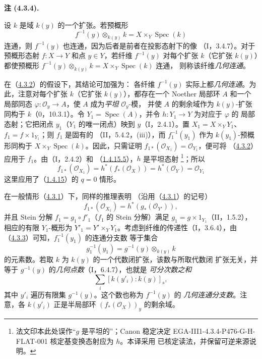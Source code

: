 \documentclass[UTF8,fontset=none,11pt,oneside,openany]{ctexbook}
\newcommand{\SourceCorrectionNote}[1]{\footnote{#1}}
\newenvironment{remark}[1][]{%
  \par\medskip\noindent\textbf{注 (#1).}\ %
}{\par}
\newcommand{\oldpage}[2][]{%
  \hypertarget{ega-source-page-#1-#2}{}%
  \marginnote{\scriptsize\textbf{#1}~|~#2}\ignorespaces}
\let\EGAOriginalLabel\label
\renewcommand{\label}[1]{\phantomsection\EGAOriginalLabel{#1}}
\begin{document}
\begin{remark}[4.3.4]
\label{III.4.3.4-fr}
设 $k$ 是域 $k(y)$ 的一个扩张。若预概形
\[
f^{-1}(y)\otimes_{k(y)}k=X\times_Y\operatorname{Spec}(k)
\]
连通，则 $f^{-1}(y)$ 也连通，因为后者是前者在投影态射下的像
（I，3.4.7）。对于预概形态射 $f:X\to Y$ 和点 $y\in Y$，若纤维
$f^{-1}(y)$ 对每个扩张 $k$（它扩张 $k(y)$）都使预概形
$f^{-1}(y)\otimes_{k(y)}k=X\times_Y\operatorname{Spec}(k)$ 连通，
则称该纤维\emph{几何连通}。

\oldpage[III]{132}

在（\hyperref[III.4.3.2-fr]{4.3.2}）的假设下，其结论可加强为：
各纤维 $f^{-1}(y)$ 实际上都\emph{几何连通}。为此，注意对每个扩张
$k$（它扩张 $k(y)$），都存在一个 Noether 局部环 $A$ 和一个局部同态
$\varphi:\mathcal O_y\to A$，使 $A$ 成为\emph{平坦} $\mathcal O_y$-模，
并使 $A$ 的剩余域作为 $k(y)$-扩张同构于 $k$（0，10.3.1）。令
$Y_1=\operatorname{Spec}(A)$，并令 $h:Y_1\to Y$ 为对应于 $\varphi$ 的
局部态射；它把闭点 $y_1$（$Y_1$ 的唯一闭点）映到 $y$（I，2.4.1）。置
$X_1=X\times_YY_1$、$f_1=f\times1_{Y_1}$；则 $f_1$ 是固有的
（II，5.4.2，(iii)），而 $f_1^{-1}(y_1)$ 作为 $k(y_1)$-预概形同构于
$X\times_Y\operatorname{Spec}(k)$。因此，只需证明
$f_{1*}(\mathcal O_{X_1})=\mathcal O_{Y_1}$，便可将
（\hyperref[III.4.3.2-fr]{4.3.2}）应用于 $f_1$。由（I，2.4.2）和
（\hyperref[III.1.4.15-fr]{1.4.15.5}），$h$ 是平坦态射
\SourceCorrectionNote{法文印本此处误作“$g$ 是平坦的”；Canon 稳定决定
EGA-III1-4.3.4-P476-G-H-FLAT-001 核定基变换态射应为 $h$。本译采用
已核定读法，并保留可逆来源说明。}；所以
\[
f_{1*}(\mathcal O_{X_1})
=h^*(f_*(\mathcal O_X))
=h^*(\mathcal O_Y)
=\mathcal O_{Y_1}
\]
这里应用了（\hyperref[III.1.4.15-fr]{1.4.15}）的 $q=0$ 情形。

在一般情形（\hyperref[III.4.3.1-fr]{4.3.1}）下，同样的推理表明
（沿用（\hyperref[III.4.3.1-fr]{4.3.1}）的记号）
\[
f_{1*}(\mathcal O_{X_1})=h^*(g_*(\mathcal O_{Y'})),
\]
并且 Stein 分解 $f_1=g_1\circ f'_1$（$f_1$ 的 Stein 分解）满足
$g_1=g\times1_{Y_1}$（II，1.5.2），相应的有限 $Y_1$-概形为
$Y'_1=Y'\times_YY_1$。考虑到纤维的传递性（I，3.6.4），由
（\hyperref[III.4.3.3-fr]{4.3.3}）可知，$f_1^{-1}(y_1)$ 的连通分支数
等于集合
\[
g_1^{-1}(y_1)=g^{-1}(y)\otimes_{k(y)}k
\]
的元素数。若取 $k$ 为 $k(y)$ 的一个代数闭扩张，该数与所取代数闭
扩张无关，并等于 $g^{-1}(y)$ 的\emph{几何点数}（I，6.4.7），也就是
\emph{可分次数之和}
\[
\sum_i[k(y'_i):k(y)]_s,
\]
其中 $y'_i$ 遍历有限集 $g^{-1}(y)$。这个数也称为 $f^{-1}(y)$ 的
\emph{几何连通分支数}。注意，各 $k(y'_i)$ 正是半局部环
$(f_*(\mathcal O_X))_y$ 的剩余域。
\end{remark}
\end{document}
